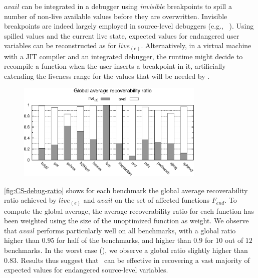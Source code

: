 $avail$ can be integrated in a debugger using {\em invisible} breakpoints to spill a number of non-live available values before they are overwritten. Invisible breakpoints are indeed largely employed in source-level debuggers (e.g., ~\cite{Zellweger83,Wu99,Jaramillo00}). Using spilled values and the current live state, expected values for endangered user variables can be reconstructed as for $live_{(e)}$. Alternatively, in a virtual machine with a JIT compiler and an integrated debugger, the runtime might decide to recompile a function when the user inserts a breakpoint in it, artificially extending the liveness range for the values that will be needed by \buildcomp.

\begin{figure}[!ht]
\begin{center}
\includegraphics[width=0.8\textwidth]{figures/CS-debug-ratio/CS-debug-ratio.eps}
\caption{\protect}
\end{center}
\end{figure}

\myfigure\ref{fig:CS-debug-ratio} shows for each benchmark the global average recoverability ratio achieved by $live_{(e)}$ and $avail$ on the set of affected functions $F_{end}$. To compute the global average, the average recoverability ratio for each function has been weighted using the size of the unoptimized function as weight. We observe that $avail$ performs particularly well on all benchmarks, with a global ratio higher than $0.95$ for half of the benchmarks, and higher than $0.9$ for $10$ out of $12$ benchmarks. In the worst case (), we observe a global ratio slightly higher than $0.83$. Results thus suggest that \buildcomp\ can be effective in recovering a vast majority of expected values for endangered source-level variables.

